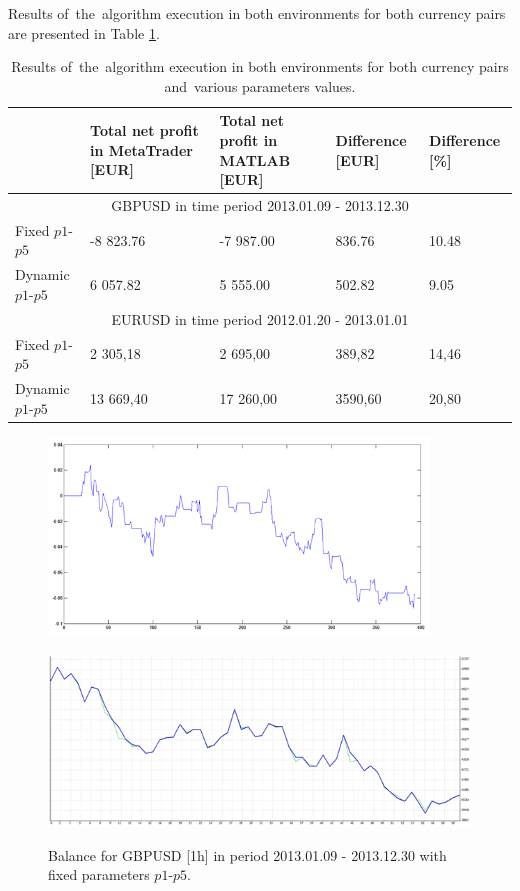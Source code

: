 \documentclass[runningheads,a4paper]{llncs}
\begin{document}
Results of~the~algorithm execution in both environments for both currency pairs are presented in Table \ref{tab:tab5}.
\begin{table}[h!]
\centering
\caption{Results of~the~algorithm execution in both environments for both currency pairs and~various parameters values.}
\label{tab:tab5}
\begin{tabular}{|p{}|p{}|p{}|p{}|p{}|} \hline
 &  Total net profit in MetaTrader [EUR]	 &  Total net profit in MATLAB 
[EUR]	 &  Difference [EUR]	 &  Difference [\%]\\ \hline
\multicolumn{5}{|c|}{GBPUSD in time period 2013.01.09 - 2013.12.30}\\ \hline
Fixed $p1$-$p5$	 & -8 823.76 & 	-7 987.00 & 	836.76 & 	10.48\\
Dynamic $p1$-$p5$	 & 6 057.82	 & 5 555.00	 & 502.82 & 	9.05\\ \hline
\multicolumn{5}{|c|}{EURUSD in time period 2012.01.20 - 2013.01.01}\\ \hline
Fixed $p1$-$p5$	 & 2 305,18 & 	2 695,00	 & 389,82	 & 14,46\\
Dynamic $p1$-$p5$ & 	13 669,40 & 	17 260,00 & 	3590,60	 & 20,80\\ \hline
\end{tabular}
\end{table}
\FloatBarrier
\begin{figure}[h!]
\begin{minipage}{0.49\textwidth}
\centering
\includegraphics[width = 0.9\textwidth]{figures/rys12.png}
\label{fig:fig12}
\end{minipage}
\begin{minipage}{0.49\textwidth}
\centering
\includegraphics[width = \textwidth]{figures/rys13.png}
\label{fig:fig13}
\end{minipage}
\caption{Balance for GBPUSD [1h] in period 2013.01.09 - 2013.12.30 with fixed parameters $p1$-$p5$.}
\end{figure}
\end{document}
